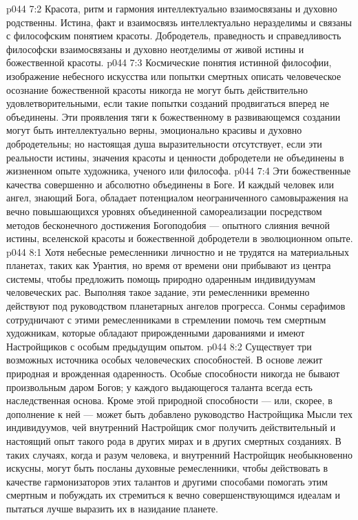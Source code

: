\vs p044 7:2 Красота, ритм и гармония интеллектуально взаимосвязаны и духовно родственны. Истина, факт и взаимосвязь интеллектуально неразделимы и связаны с философским понятием красоты. Добродетель, праведность и справедливость философски взаимосвязаны и духовно неотделимы от живой истины и божественной красоты.
\vs p044 7:3 Космические понятия истинной философии, изображение небесного искусства или попытки смертных описать человеческое осознание божественной красоты никогда не могут быть действительно удовлетворительными, если такие попытки созданий продвигаться вперед не объединены. Эти проявления тяги к божественному в развивающемся создании могут быть интеллектуально верны, эмоционально красивы и духовно добродетельны; но настоящая душа выразительности отсутствует, если эти реальности истины, значения красоты и ценности добродетели не объединены в жизненном опыте художника, ученого или философа.
\vs p044 7:4 Эти божественные качества совершенно и абсолютно объединены в Боге. И каждый человек или ангел, знающий Бога, обладает потенциалом неограниченного самовыражения на вечно повышающихся уровнях объединенной самореализации посредством методов бесконечного достижения Богоподобия --- опытного слияния вечной истины, вселенской красоты и божественной добродетели в эволюционном опыте.
\vs p044 8:1 Хотя небесные ремесленники личностно и не трудятся на материальных планетах, таких как Урантия, но время от времени они прибывают из центра системы, чтобы предложить помощь природно одаренным индивидуумам человеческих рас. Выполняя такое задание, эти ремесленники временно действуют под руководством планетарных ангелов прогресса. Сонмы серафимов сотрудничают с этими ремесленниками в стремлении помочь тем смертным художникам, которые обладают прирожденными дарованиями и имеют Настройщиков с особым предыдущим опытом.
\vs p044 8:2 Существует три возможных источника особых человеческих способностей. В основе  лежит природная и врожденная одаренность. Особые способности никогда не бывают произвольным даром Богов; у каждого выдающегося таланта всегда есть наследственная основа. Кроме этой природной способности --- или, скорее, в дополнение к ней --- может быть добавлено руководство Настройщика Мысли тех индивидуумов, чей внутренний Настройщик смог получить действительный и настоящий опыт такого рода в других мирах и в других смертных созданиях. В таких случаях, когда и разум человека, и внутренний Настройщик необыкновенно искусны, могут быть посланы духовные ремесленники, чтобы действовать в качестве гармонизаторов этих талантов и другими способами помогать этим смертным и побуждать их стремиться к вечно совершенствующимся идеалам и пытаться лучше выразить их в назидание планете.
